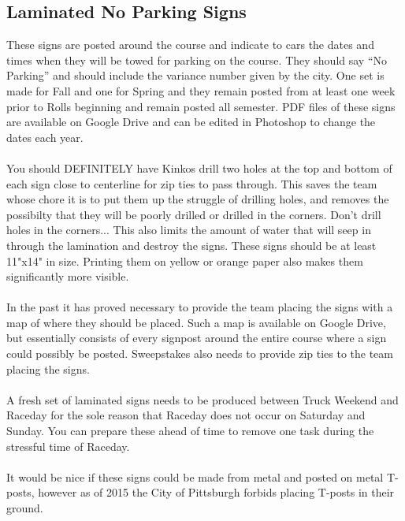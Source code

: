 \subsection{Laminated No Parking Signs}
These signs are posted around the course and indicate to cars the dates and
times when they will be towed for parking on the course. They should say
``No Parking'' and should include the variance number given by the city.
One set is made for Fall and one for Spring and they remain posted from at
least one week prior to Rolls beginning and remain posted all semester. PDF
files of these signs are available on Google Drive and can be edited in
Photoshop to change the dates each year.
\\\\
You should DEFINITELY have Kinkos drill two holes at the top and bottom of
each sign close to centerline for zip ties to pass through. This
saves the team whose chore it is to put them up the struggle of drilling holes,
and removes the possibilty that they will be poorly drilled or drilled in the
corners. Don't drill holes in the corners... This also limits the amount of
water that will seep in through the lamination and destroy the signs. These
signs should be at least 11"x14" in size. Printing them on yellow or orange
paper also makes them significantly more visible.
\\\\
In the past it has proved necessary to provide the team placing the signs
with a map of where they should be placed. Such a map is available on Google
Drive, but essentially consists of every signpost around the entire course
where a sign could possibly be posted. Sweepstakes also needs to provide
zip ties to the team placing the signs.
\\\\
A fresh set of laminated signs needs to be produced between Truck Weekend
and Raceday for the sole reason that Raceday does not occur on Saturday and
Sunday. You can prepare these ahead of time to remove one task during the
stressful time of Raceday.
\\\\
It would be nice if these signs could be made from metal and posted on metal
T-posts, however as of 2015 the City of Pittsburgh forbids placing
T-posts in their ground.

